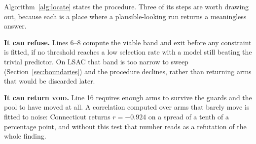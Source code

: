 \documentclass[9pt,conference]{IEEEtran}
\begin{document}
Algorithm~\ref{alg:locate} states the procedure. Three of its steps are worth drawing out,
because each is a place where a plausible-looking run returns a meaningless answer.

\textbf{It can refuse.} Lines 6--8 compute the viable band and exit before any constraint is
fitted, if no threshold reaches a low selection rate with a model still beating the trivial
predictor. On LSAC that band is too narrow to sweep (Section~\ref{sec:boundaries}) and the procedure
declines, rather than returning arms that would be discarded later.

\textbf{It can return \textsc{void}.} Line 16 requires enough arms to survive the guards
and the pool to have moved at all. A
correlation computed over arms that barely move is fitted to noise: Connecticut returns
$r=-0.924$ on a spread of a tenth of a percentage point, and without this test that number
reads as a refutation of the whole finding.
\end{document}
